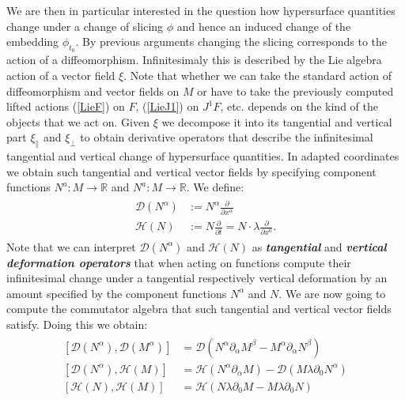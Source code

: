 \documentclass[a4paper,12pt, DIV=14, BCOR=5mm, twoside, headsepline]{scrbook}
\begin{document}
We are then in particular interested in the question how hypersurface quantities change under a change of slicing $\phi$ and hence an induced change  of the embedding $\phi_{t_0}$. By previous arguments changing the slicing corresponds to the action of a diffeomorphism. Infinitesimaly this is described by the Lie algebra action of a vector field $\xi$. Note that whether we can take the standard action of diffeomorphism and vector fields on $M$ or have to take the previously computed lifted actions (\ref{LieF}) on $F$, (\ref{LieJ1}) on $J^1F$, etc. depends on the kind of the objects that we act on.  Given $\xi$ we decompose it into its tangential and vertical part $\xi_{\parallel}$ and $\xi_{\perp}$ to obtain derivative operators that describe the infinitesimal tangential and vertical change of hypersurface quantities.  In adapted coordinates we obtain such tangential and vertical vector fields by specifying component functions
 $N^a : M \rightarrow \mathbb{R}$ and $N^a : M \rightarrow \mathbb{R}$. We define: 
\begin{align}
    \begin{aligned}
    \mathcal{D}(N^{\alpha}) &:= N^{\alpha} \frac{\partial}{\partial x^{\alpha}} \\
    \mathcal{H}(N) &:= N \frac{\partial}{\partial t} = N \cdot \lambda \frac{\partial}{\partial x^0}.
    \end{aligned}
\end{align} 
Note that we can interpret $\mathcal{D}(N^\alpha)$ and $\mathcal{H}(N)$ as \textit{\textbf{tangential}} and \textit{\textbf{vertical deformation operators}} that when acting on functions compute their infinitesimal change under a tangential respectively vertical deformation by an amount specified by the component functions $N^{\alpha}$ and $N$.
We are now going to compute the commutator algebra that such tangential and vertical vector fields satisfy. Doing this we obtain:
\begin{align}
    \begin{aligned}
    \left [ \mathcal{D}(N^{\alpha}), \mathcal{D}(M^{\alpha}) \right] &= \mathcal{D}(N^\alpha \partial_{\alpha}M^{\beta} - M^{\alpha} \partial_{\alpha} N^{\beta}) \\
    \left[ \mathcal{D}(N^{\alpha}), \mathcal{H}(M) \right] &= \mathcal{H}(N^{\alpha} \partial_{\alpha} M) - \mathcal{D}(M \lambda \partial_0 N^{\alpha})\\
    \left[ \mathcal{H}(N), \mathcal{H}(M) \right ] &= \mathcal{H}(N \lambda \partial_0 M - M \lambda \partial_0N)
    \end{aligned}
\end{align}
\end{document}
